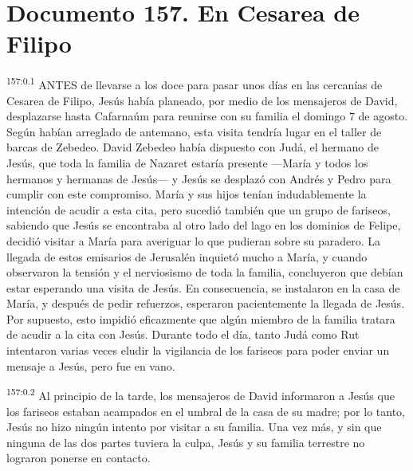 \chapter{Documento 157. En Cesarea de Filipo}
\par
\textsuperscript{157:0.1} ANTES de llevarse a los doce para pasar unos días en las cercanías de Cesarea de Filipo, Jesús había planeado, por medio de los mensajeros de David, desplazarse hasta Cafarnaúm para reunirse con su familia el domingo 7 de agosto. Según habían arreglado de antemano, esta visita tendría lugar en el taller de barcas de Zebedeo. David Zebedeo había dispuesto con Judá, el hermano de Jesús, que toda la familia de Nazaret estaría presente ---María y todos los hermanos y hermanas de Jesús--- y Jesús se desplazó con Andrés y Pedro para cumplir con este compromiso. María y sus hijos tenían indudablemente la intención de acudir a esta cita, pero sucedió también que un grupo de fariseos, sabiendo que Jesús se encontraba al otro lado del lago en los dominios de Felipe, decidió visitar a María para averiguar lo que pudieran sobre su paradero. La llegada de estos emisarios de Jerusalén inquietó mucho a María, y cuando observaron la tensión y el nerviosismo de toda la familia, concluyeron que debían estar esperando una visita de Jesús. En consecuencia, se instalaron en la casa de María, y después de pedir refuerzos, esperaron pacientemente la llegada de Jesús. Por supuesto, esto impidió eficazmente que algún miembro de la familia tratara de acudir a la cita con Jesús. Durante todo el día, tanto Judá como Rut intentaron varias veces eludir la vigilancia de los fariseos para poder enviar un mensaje a Jesús, pero fue en vano.

\par
\textsuperscript{157:0.2} Al principio de la tarde, los mensajeros de David informaron a Jesús que los fariseos estaban acampados en el umbral de la casa de su madre; por lo tanto, Jesús no hizo ningún intento por visitar a su familia. Una vez más, y sin que ninguna de las dos partes tuviera la culpa, Jesús y su familia terrestre no lograron ponerse en contacto.

